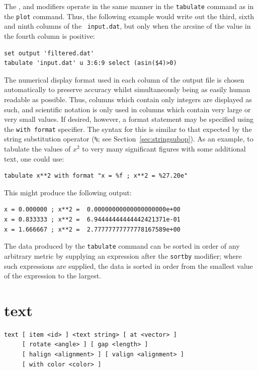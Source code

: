 The ,  and  modifiers operate in
the same manner in the {\tt tabulate} command as in the {\tt plot} command.
Thus, the following example would write out the third, sixth and ninth columns
of the \datafile\ {\tt input.dat}, but only when the arcsine of the value in the
fourth column is positive:

\begin{verbatim}
set output 'filtered.dat'
tabulate 'input.dat' u 3:6:9 select (asin($4)>0)
\end{verbatim}

The numerical display format used in each column of the output file is chosen
automatically to preserve accuracy whilst simultaneously being as easily human
readable as possible.  Thus, columns which contain only integers are displayed
as such, and scientific notation is only used in columns which contain very
large or very small values.  If desired, however, a format statement may be
specified using the {\tt with format} specifier. The syntax for this is similar
to that expected by the string substitution operator ({\tt \%}; see
Section~\ref{sec:stringsubop}). As an example, to tabulate the values of $x^2$
to very many significant figures with some additional text, one could use:

\begin{verbatim}
tabulate x**2 with format "x = %f ; x**2 = %27.20e"
\end{verbatim}

\noindent This might produce the following output:

\begin{verbatim}
x = 0.000000 ; x**2 =  0.00000000000000000000e+00
x = 0.833333 ; x**2 =  6.94444444444442421371e-01
x = 1.666667 ; x**2 =  2.77777777777778167589e+00
\end{verbatim}

The data produced by the {\tt tabulate} command can be sorted in order of any
arbitrary metric by supplying an expression after the {\tt sortby} modifier;
where such expressions are supplied, the data is sorted in order from the
smallest value of the expression to the largest.


\section{text}

\begin{verbatim}
text [ item <id> ] <text string> [ at <vector> ]
     [ rotate <angle> ] [ gap <length> ]
     [ halign <alignment> ] [ valign <alignment> ]
     [ with color <color> ]
\end{verbatim}


